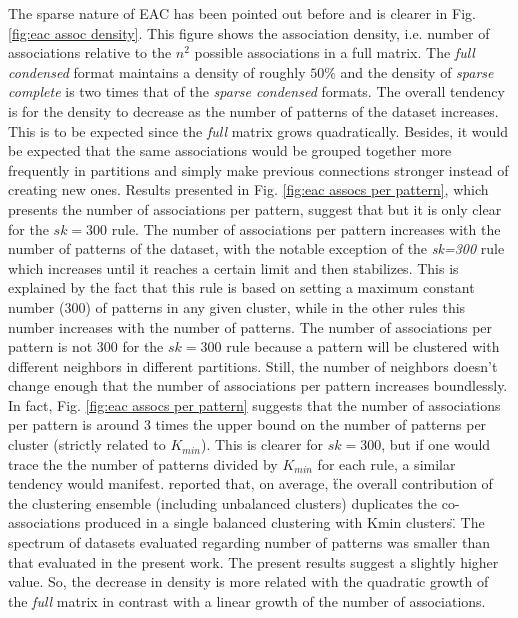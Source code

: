 The sparse nature of EAC has been pointed out before and is clearer in Fig. \ref{fig:eac assoc density}.
This figure shows the association density, i.e. number of associations relative to the $n^2$ possible associations in a full matrix.
The \emph{full condensed} format maintains a density of roughly $50\%$ and the density of \emph{sparse complete} is two times that of the \emph{sparse condensed} formats.
The overall tendency is for the density to decrease as the number of patterns of the dataset increases.
This is to be expected since the \emph{full} matrix grows quadratically.
Besides, it would be expected that the same associations would be grouped together more frequently in partitions and simply make previous connections stronger instead of creating new ones.
Results presented in Fig. \ref{fig:eac assocs per pattern}, which presents the number of associations per pattern, suggest that but it is only clear for the $sk=300$ rule.
The number of associations per pattern increases with the number of patterns of the dataset, with the notable exception of the \emph{sk=300} rule which increases until it reaches a certain limit and then stabilizes.
This is explained by the fact that this rule is based on setting a maximum constant number ($300$) of patterns in any given cluster, while in the other rules this number increases with the number of patterns.
The number of associations per pattern is not $300$ for the $sk=300$ rule because a pattern will be clustered with different neighbors in different partitions.
Still, the number of neighbors doesn't change enough that the number of associations per pattern increases boundlessly.
In fact, Fig. \ref{fig:eac assocs per pattern} suggests that the number of associations per pattern is around 3 times the upper bound on the number of patterns per cluster (strictly related to $K_{min}$).
This is clearer for $sk=300$, but if one would trace the the number of patterns divided by $K_{min}$ for each rule, a similar tendency would manifest.
\citet{Lourenco2010} reported that, on average, \"the overall contribution of the clustering ensemble (including unbalanced clusters) duplicates the co-associations produced in a single balanced clustering with Kmin clusters\".
The spectrum of datasets evaluated regarding number of patterns was smaller than that evaluated in the present work.
The present results suggest a slightly higher value.
So, the decrease in density is more related with the quadratic growth of the \emph{full} matrix in contrast with a linear growth of the number of associations.

